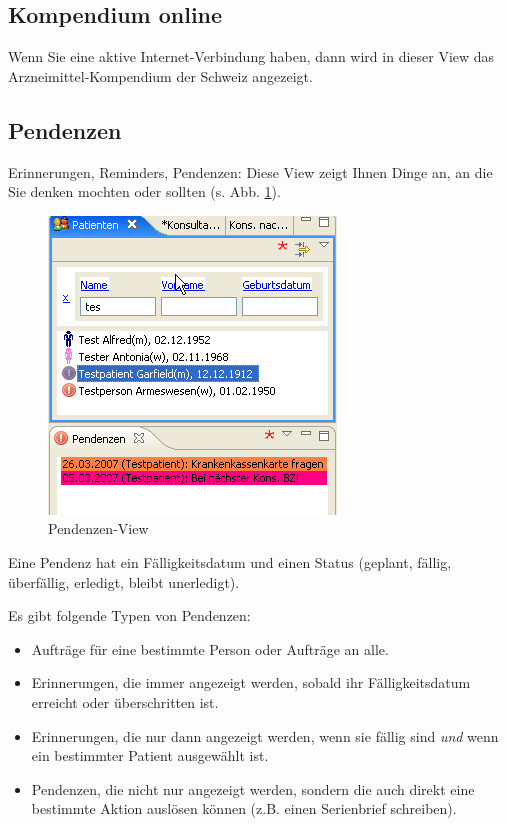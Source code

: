 \subsection{Kompendium online}
Wenn Sie eine aktive Internet-Verbindung haben, dann wird in dieser View das
Arzneimit\-tel-Kom\-pen\-dium der Schweiz angezeigt.

\subsection{Pendenzen}
Erinnerungen, Reminders, Pendenzen: Diese View zeigt Ihnen Dinge an, an die Sie
denken mochten oder sollten (s. Abb. \ref{fig:pendenzen}).
\begin{figure}[htp]
\begin{center}
  \includegraphics{images/pendenzenview}
  \caption{Pendenzen-View}
  \label{fig:pendenzen}
\end{center}
\end{figure}


Eine Pendenz hat ein Fälligkeitsdatum und einen Status (geplant, fällig,
überfällig, erledigt, bleibt unerledigt).

Es gibt folgende Typen von Pendenzen:
\begin{itemize}
  \item Aufträge für eine bestimmte Person oder Aufträge an alle.
  \item Erinnerungen, die immer angezeigt werden, sobald ihr Fälligkeitsdatum
  erreicht oder überschritten ist.
  \item Erinnerungen, die nur dann angezeigt werden, wenn sie fällig sind
  \textit{und} wenn ein bestimmter Patient ausgewählt ist.
  \item Pendenzen, die nicht nur angezeigt werden, sondern die auch direkt eine
  bestimmte Aktion auslösen können (z.B. einen Serienbrief schreiben).
\end{itemize}

